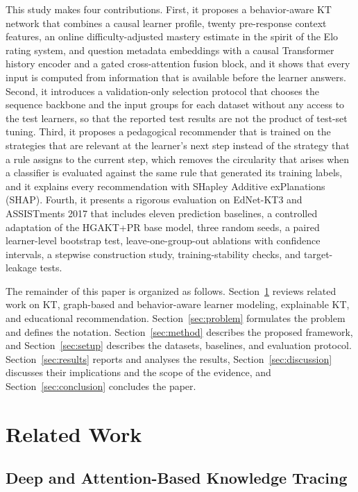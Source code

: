\documentclass[11pt]{article}
\begin{document}
This study makes four contributions. First, it proposes a behavior-aware KT network that combines a causal learner profile, twenty pre-response context features, an online difficulty-adjusted mastery estimate in the spirit of the Elo rating system, and question metadata embeddings with a causal Transformer history encoder and a gated cross-attention fusion block, and it shows that every input is computed from information that is available before the learner answers. Second, it introduces a validation-only selection protocol that chooses the sequence backbone and the input groups for each dataset without any access to the test learners, so that the reported test results are not the product of test-set tuning. Third, it proposes a pedagogical recommender that is trained on the strategies that are relevant at the learner's next step instead of the strategy that a rule assigns to the current step, which removes the circularity that arises when a classifier is evaluated against the same rule that generated its training labels, and it explains every recommendation with SHapley Additive exPlanations (SHAP). Fourth, it presents a rigorous evaluation on EdNet-KT3 and ASSISTments 2017 that includes eleven prediction baselines, a controlled adaptation of the HGAKT+PR base model, three random seeds, a paired learner-level bootstrap test, leave-one-group-out ablations with confidence intervals, a stepwise construction study, training-stability checks, and target-leakage tests.

The remainder of this paper is organized as follows. Section~\ref{sec:related} reviews related work on KT, graph-based and behavior-aware learner modeling, explainable KT, and educational recommendation. Section~\ref{sec:problem} formulates the problem and defines the notation. Section~\ref{sec:method} describes the proposed framework, and Section~\ref{sec:setup} describes the datasets, baselines, and evaluation protocol. Section~\ref{sec:results} reports and analyses the results, Section~\ref{sec:discussion} discusses their implications and the scope of the evidence, and Section~\ref{sec:conclusion} concludes the paper.

\section{Related Work}\label{sec:related}

\subsection{Deep and Attention-Based Knowledge Tracing}
\end{document}
